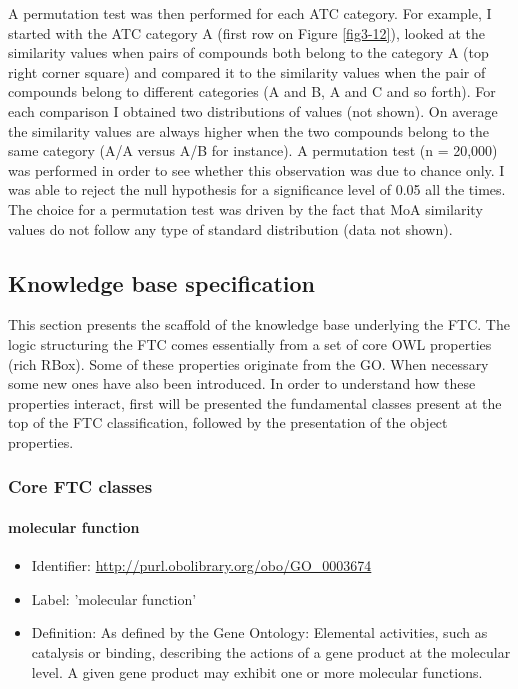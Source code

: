 A permutation test was then performed for each ATC category. For example, I started with the ATC category A (first row on Figure \ref{fig3-12}), looked at the similarity values when pairs of compounds both belong to the category A (top right corner square) and compared it to the similarity values when the pair of compounds belong to different categories (A and B, A and C and so forth). For each comparison I obtained two distributions of values (not shown). On average the similarity values are always higher when the two compounds belong to the same category (A/A versus A/B for instance). A permutation test (n = 20,000) was performed in order to see whether this observation was due to chance only. I was able to reject the null hypothesis for a significance level of 0.05 all the times. The choice for a permutation test was driven by the fact that MoA similarity values do not follow any type of standard distribution (data not shown).

\subsection{Knowledge base specification}
\label{specskb}

This section presents the scaffold of the knowledge base underlying the FTC. The logic structuring the FTC comes essentially from a set of core OWL properties (rich RBox). Some of these properties originate from the GO. When necessary some new ones have also been introduced. In order to understand how these properties interact, first will be presented the fundamental classes present at the top of the FTC classification, followed by the presentation of the object properties.

\subsubsection{Core FTC classes}

\paragraph{molecular function}
\begin{itemize}
  \item Identifier: \url{http://purl.obolibrary.org/obo/GO\_0003674}
  \item Label: 'molecular function'
  \item Definition: As defined by the Gene Ontology: Elemental activities, such as catalysis or binding, describing the actions of a gene product at the molecular level. A given gene product may exhibit one or more molecular functions.
\end{itemize}

